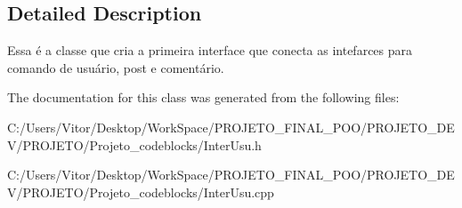 \subsection{Detailed Description}
Essa é a classe que cria a primeira interface que conecta as intefarces para comando de usuário, post e comentário. 

The documentation for this class was generated from the following files\-:\begin{DoxyCompactItemize}
\item 
C\-:/\-Users/\-Vitor/\-Desktop/\-Work\-Space/\-P\-R\-O\-J\-E\-T\-O\-\_\-\-F\-I\-N\-A\-L\-\_\-\-P\-O\-O/\-P\-R\-O\-J\-E\-T\-O\-\_\-\-D\-E\-V/\-P\-R\-O\-J\-E\-T\-O/\-Projeto\-\_\-codeblocks/Inter\-Usu.\-h\item 
C\-:/\-Users/\-Vitor/\-Desktop/\-Work\-Space/\-P\-R\-O\-J\-E\-T\-O\-\_\-\-F\-I\-N\-A\-L\-\_\-\-P\-O\-O/\-P\-R\-O\-J\-E\-T\-O\-\_\-\-D\-E\-V/\-P\-R\-O\-J\-E\-T\-O/\-Projeto\-\_\-codeblocks/Inter\-Usu.\-cpp\end{DoxyCompactItemize}

